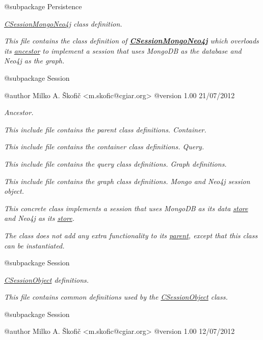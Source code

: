 {\itshape \begin{DoxyVerb} @subpackage        Persistence\end{DoxyVerb}
}

{\itshape {\itshape \hyperlink{class_c_session_mongo_neo4j}{C\-Session\-Mongo\-Neo4j}} class definition.}

{\itshape This file contains the class definition of {\bfseries \hyperlink{class_c_session_mongo_neo4j}{C\-Session\-Mongo\-Neo4j}} which overloads its \hyperlink{class_c_session_object}{ancestor} to implement a session that uses Mongo\-D\-B as the database and Neo4j as the graph.}

{\itshape \begin{DoxyVerb} @subpackage        Session

 @author            Milko A. Škofič <m.skofic@cgiar.org>
 @version   1.00 21/07/2012\end{DoxyVerb}
}

{\itshape Ancestor.}

{\itshape This include file contains the parent class definitions. Container.}

{\itshape This include file contains the container class definitions. Query.}

{\itshape This include file contains the query class definitions. Graph definitions.}

{\itshape This include file contains the graph class definitions. Mongo and Neo4j session object.}

{\itshape This concrete class implements a session that uses Mongo\-D\-B as its data \hyperlink{}{store} and Neo4j as its \hyperlink{}{store}.}

{\itshape The class does not add any extra functionality to its \hyperlink{class_c_session_object}{parent}, except that this class can be instantiated.}

{\itshape \begin{DoxyVerb} @subpackage        Session\end{DoxyVerb}
}

{\itshape \hyperlink{class_c_session_object}{C\-Session\-Object} definitions.}

{\itshape This file contains common definitions used by the \hyperlink{class_c_session_object}{C\-Session\-Object} class.}

{\itshape \begin{DoxyVerb} @subpackage        Session

 @author            Milko A. Škofič <m.skofic@cgiar.org>
 @version   1.00 12/07/2012\end{DoxyVerb}
}


